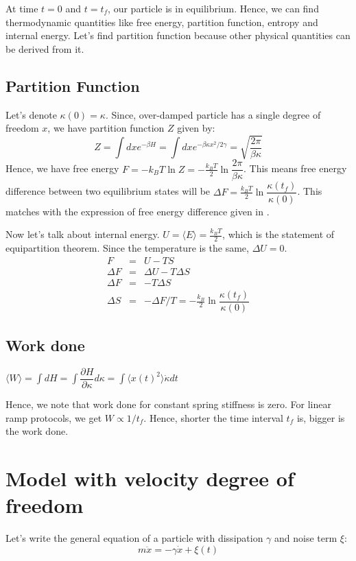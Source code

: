 \documentclass[11pt,a4paper]{article}
\begin{document}
At time $t=0$ and $t=t_f$, our particle is in equilibrium. Hence, we can find thermodynamic quantities like free energy, partition function, entropy and internal energy. Let's find partition function because other physical quantities can be derived from it.

\subsection*{Partition Function}
Let's denote $\kappa(0)= \kappa$. Since, over-damped particle has a single degree of freedom $x$, we have partition function $Z$ given by:
\begin{equation}
Z = \int dx e^{-\beta H}= \int dx e^{-\beta \kappa  x^2/2 \gamma}= \sqrt{\dfrac{2  \pi}{\beta \kappa}}
\end{equation}
Hence, we have free energy $F = -k_B T \ln Z=-\frac{k_B T}{2} \ln \dfrac{2   \pi}{\beta \kappa} $. This means free energy difference between two equilibrium states will be $\Delta F =\frac{k_B T}{2} \ln \dfrac{\kappa(t_f)}{\kappa(0)} $. This matches with the expression of free energy difference given in \cite{martinez2016engineered}.

Now let's talk about internal energy. $U= \langle E \rangle = \frac{k_B T}{2}$, which is the statement of equipartition theorem. Since the temperature is the same, $\Delta U=0$.
\begin{eqnarray*}
 F&=& U-TS\\
 \Delta F &=& \Delta U-T \Delta S \\
  \Delta F &=& -T \Delta S \\
  \Delta S &=& - \Delta F/ T= -\frac{k_B}{2} \ln \dfrac{\kappa(t_f)}{\kappa(0)} 
\end{eqnarray*}

\subsection*{Work done}
$\langle W \rangle= \int dH = \int \dfrac{\partial H}{\partial \kappa} d\kappa= \int \langle x(t)^2 \rangle \dot{\kappa} dt$


Hence, we note that work done for constant spring stiffness is zero. For linear ramp protocols, we get $W \propto 1/t_f$. Hence, shorter the time interval $t_f$ is, bigger is the work done.

\appendix

\section{Model with velocity degree of freedom}\label{sec.vel_dof}
Let's write the general equation of a particle with dissipation $\gamma$ and noise term $\xi$:
\begin{equation}
m \ddot{x}= -\gamma \dot{x} + \xi(t)
\end{equation}
\end{document}
